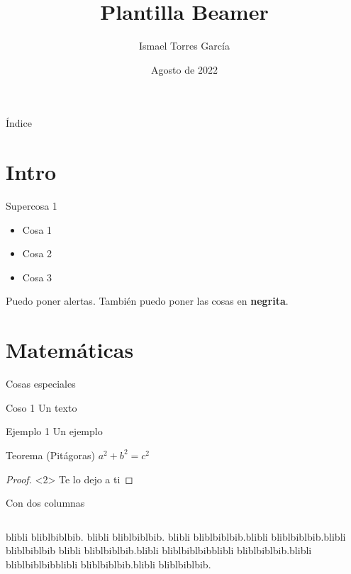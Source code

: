 \documentclass[14pt]{beamer}
\title{Plantilla Beamer}
\author{Ismael Torres García}
\date{Agosto de 2022}
\begin{document}
\maketitle

\begin{frame}{Índice}
    \tableofcontents
\end{frame}

\section{Intro}

\begin{frame}{Supercosa 1}

\begin{itemize}
    \item<1-> Cosa 1
    \item<2-> Cosa 2
    \item<3-> Cosa 3
\end{itemize}


Puedo poner \alert<1>{alertas}. También puedo poner las cosas en \textbf<2>{negrita}.

\end{frame}

\section{Matemáticas}

\begin{frame}{Cosas especiales}

\begin{block}{Coso 1}
    Un texto
\end{block}

\begin{exampleblock}{Ejemplo 1}
     Un ejemplo
\end{exampleblock}

\begin{block}{Teorema (Pitágoras)}
    $a^2+b^2=c^2$
\end{block}

\begin{proof}<2>
    Te lo dejo a ti
\end{proof}
    
\end{frame}

\begin{frame}{Con dos columnas}
    \begin{columns}
         blibli bliblbiblbib. blibli bliblbiblbib. blibli bliblbiblbib.blibli bliblbiblbib.blibli bliblbiblbib 
         blibli bliblbiblbib.blibli bliblbiblbibblibli bliblbiblbib.blibli bliblbiblbibblibli bliblbiblbib.blibli bliblbiblbib.
    \end{columns}
\end{frame}
\end{document}
